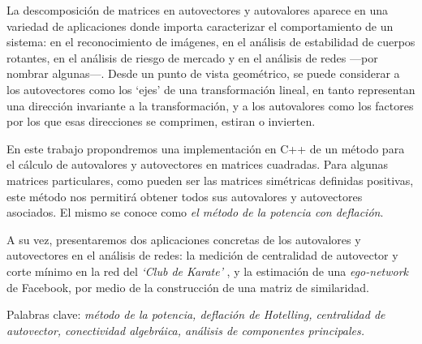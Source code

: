 La descomposición de matrices en autovectores y autovalores aparece en una variedad de aplicaciones donde importa caracterizar el comportamiento de un sistema: en el reconocimiento de imágenes, en el análisis de estabilidad de cuerpos rotantes, en el análisis de riesgo de mercado y en el análisis de redes ---por nombrar algunas---. Desde un punto de vista geométrico, se puede considerar a los autovectores como los `ejes' de una transformación lineal, en tanto representan una dirección invariante a la transformación, y a los autovalores como los factores por los que esas direcciones se comprimen, estiran o invierten. 

\vspace{1em}
En este trabajo propondremos una implementación en C++ de un método para el cálculo de autovalores y autovectores en matrices cuadradas. Para algunas matrices particulares, como pueden ser las matrices simétricas definidas positivas, este método nos permitirá obtener todos sus autovalores y autovectores asociados. El mismo se conoce como \textit{el método de la potencia con deflación}. 

A su vez, presentaremos dos aplicaciones concretas de los autovalores y autovectores en el análisis de redes: la medición de centralidad de autovector y corte mínimo en la red del \textit{`Club de Karate'} \cite{Zachary}, y la estimación de una \textit{ego-network} \cite{Leskovec} de Facebook, por medio de la construcción de una matriz de similaridad.  

\vspace{1em}
\noindent Palabras clave: \textit{método de la potencia, deflación de Hotelling, centralidad de autovector, conectividad algebráica, análisis de componentes principales.}
